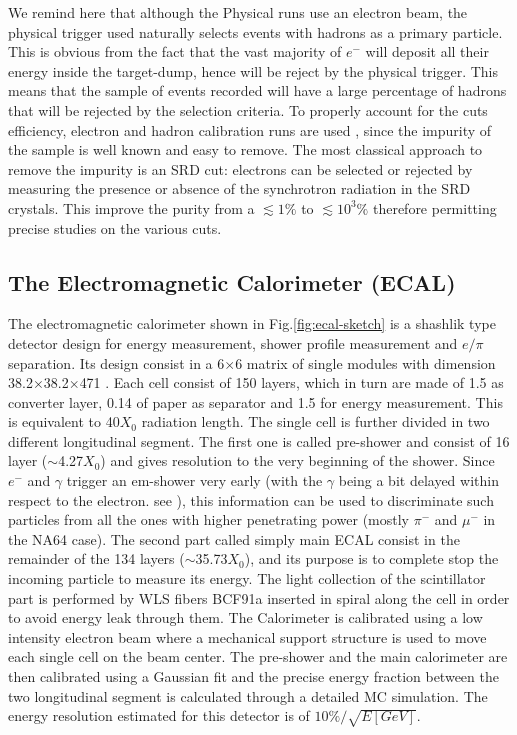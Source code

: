 We remind here that although the Physical runs use an electron beam, the physical trigger used naturally selects events with hadrons as a primary particle. This is obvious from the fact that the vast majority of $e^-$ will deposit all their energy inside the target-dump, hence will be reject by the physical trigger. This means that the sample of events recorded will have a large percentage of hadrons that will be rejected by the selection criteria. To properly account for the cuts efficiency, electron and hadron calibration runs are used , since the impurity of the sample is well known and easy to remove. The most classical approach to remove the impurity is an SRD cut: electrons can be selected or rejected by measuring the presence or absence  of the synchrotron radiation in the SRD crystals. This improve the purity from a $\lesssim 1\%$ to $\lesssim 10^{3}\%$ therefore permitting precise studies on the various cuts. 

\subsection{The Electromagnetic Calorimeter (ECAL)}
\label{chapter2:sec:detectors-ecal}

The electromagnetic calorimeter shown in Fig.\ref{fig:ecal-sketch} is a shashlik type detector design for energy measurement, shower profile measurement and $e/\pi$ separation. Its design consist in a 6$\times$6 matrix of single modules with dimension 38.2$\times$38.2$\times$471 \mmc. Each cell consist of 150 layers, which in turn are made of 1.5 \mmi as converter layer, 0.14 \mmi of paper as separator and 1.5 \mmi for energy measurement. This is equivalent to 40$X_0$ radiation length. The single cell is further divided in two different longitudinal segment. The first one is called pre-shower and consist of 16 layer ($\sim$4.27$X_0$) and gives resolution to the very beginning of the shower. Since $e^-$ and $\gamma$ trigger an em-shower very early (with the $\gamma$ being a bit delayed within respect to the electron. see \cite{Bichsel:2002cf}), this information can be used to discriminate such particles from all the ones with higher penetrating power (mostly $\pi^-$ and $\mu^-$ in the NA64 case). The second part called simply main ECAL consist in the remainder of the 134 layers ($\sim$35.73$X_0$), and its purpose is to complete stop the incoming particle to measure its energy. The light collection of the scintillator part is performed by WLS fibers BCF91a \cite{wls-fibers} inserted in spiral along the cell in order to avoid energy leak through them. The Calorimeter is calibrated using a low intensity electron beam where a mechanical support structure is used to move each single cell on the beam center. The pre-shower and the main calorimeter are then calibrated using a Gaussian fit and the precise energy fraction between the two longitudinal segment is calculated through a detailed MC simulation. The energy resolution estimated for this detector is of $10\% / \sqrt{E[GeV]}$.

